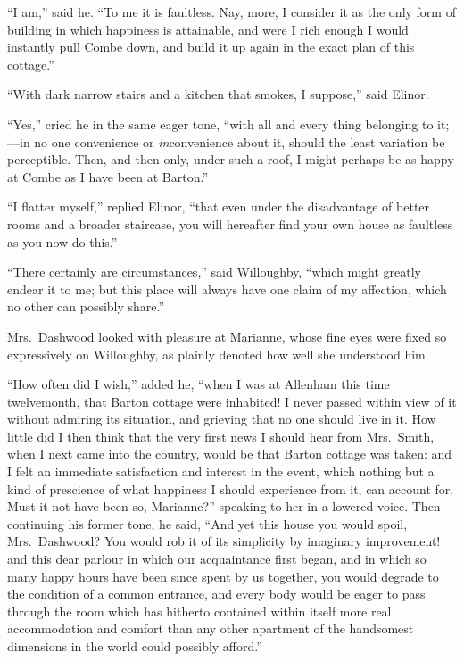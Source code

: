 \documentclass{article}
\begin{document}
``I am,'' said he.  ``To me it is faultless.  Nay, more,
I consider it as the only form of building in which happiness
is attainable, and were I rich enough I would instantly pull
Combe down, and build it up again in the exact plan of this
cottage.''

``With dark narrow stairs and a kitchen that smokes,
I suppose,'' said Elinor.

``Yes,'' cried he in the same eager tone, ``with all
and every thing belonging to it;---in no one convenience
or \emph{in}convenience about it, should the least variation
be perceptible.  Then, and then only, under such a roof, I
might perhaps be as happy at Combe as I have been at Barton.''

``I flatter myself,'' replied Elinor, ``that even under
the disadvantage of better rooms and a broader staircase,
you will hereafter find your own house as faultless as you
now do this.''

``There certainly are circumstances,'' said Willoughby,
``which might greatly endear it to me; but this place will
always have one claim of my affection, which no other can
possibly share.''

Mrs.\ Dashwood looked with pleasure at Marianne,
whose fine eyes were fixed so expressively on Willoughby,
as plainly denoted how well she understood him.

``How often did I wish,'' added he, ``when I was at
Allenham this time twelvemonth, that Barton cottage were
inhabited!  I never passed within view of it without admiring
its situation, and grieving that no one should live in it.
How little did I then think that the very first news
I should hear from Mrs.\ Smith, when I next came into
the country, would be that Barton cottage was taken: and I
felt an immediate satisfaction and interest in the event,
which nothing but a kind of prescience of what happiness I
should experience from it, can account for.  Must it not have
been so, Marianne?'' speaking to her in a lowered voice.
Then continuing his former tone, he said, ``And yet this
house you would spoil, Mrs.\ Dashwood?  You would rob it
of its simplicity by imaginary improvement! and this dear
parlour in which our acquaintance first began, and in which
so many happy hours have been since spent by us together,
you would degrade to the condition of a common entrance,
and every body would be eager to pass through the room
which has hitherto contained within itself more real
accommodation and comfort than any other apartment of
the handsomest dimensions in the world could possibly afford.''
\end{document}
